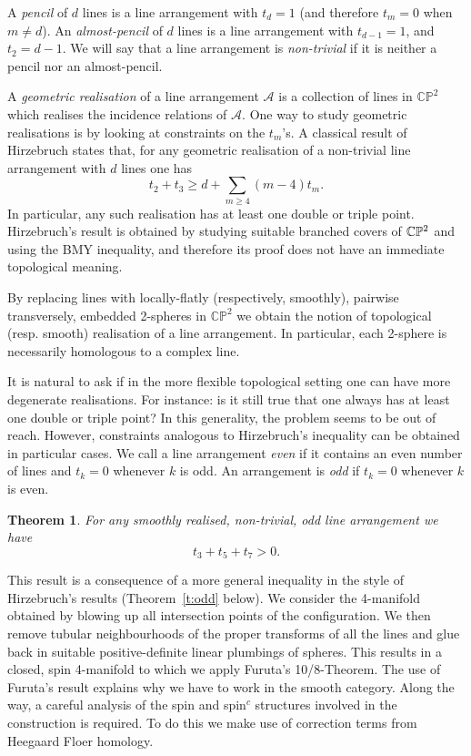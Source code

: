 \documentclass[a4paper,12pt, onesided]{amsart}
\newtheorem{thm}{Theorem}[section]
\theoremstyle{remark}
\numberwithin{figure}{section}
\numberwithin{equation}{section}
\newcommand{\CP}{\mathbb{CP}\vphantom{\mathbb{P}}^2}
\newcommand{\A}{\mathcal{A}}
\begin{document}
A \emph{pencil} of $d$ lines is a line arrangement with $t_d=1$ (and therefore $t_m=0$ when $m\neq d$).
An \emph{almost-pencil} of $d$ lines is a line arrangement with $t_{d-1}=1$, and $t_2 = d-1$.
We will say that a line arrangement is \emph{non-trivial} if it is neither a pencil nor an almost-pencil.

A \emph{geometric realisation} of a line arrangement $\A$ is a collection of lines in $\mathbb{CP}^2$ which realises the incidence relations of $\A$. One way to study geometric realisations is by looking at constraints on the $t_m$'s. A classical result of Hirzebruch \cite{Hirzebruch:1983} states that, for any geometric realisation of a non-trivial line arrangement with $d$ lines one has
\[
t_2+t_3\geq d+\sum_{m\geq 4}(m-4)t_m.
\]
In particular, any such realisation has at least one double or triple point. Hirzebruch's result is obtained by studying suitable branched covers of $\CP$ and using the BMY inequality, and therefore its proof does not have an immediate topological meaning.

By replacing lines with locally-flatly (respectively, smoothly),
pairwise transversely,
embedded 2-spheres in $\mathbb{CP}^2$ we obtain the notion of topological (resp. smooth) realisation of a line arrangement.
In particular, each 2-sphere is necessarily homologous to a complex line.


It is natural to ask if in the more flexible topological setting
one can have more degenerate realisations. For instance: is it still true that one always has at least one double or triple point? In this generality, the problem seems to be out of reach. However, constraints analogous to Hirzebruch's inequality can be obtained in particular cases. We call a line arrangement \emph{even} if it contains an even number of lines and $t_k=0$ whenever $k$ is odd.  An arrangement is \emph{odd} if $t_k=0$ whenever $k$ is even.

\begin{thm}\label{thm:oddbound}
    For any smoothly realised, non-trivial, odd line arrangement  we have
    \[
    t_3+t_5+t_7>0.
    \]
\end{thm}

This result is a consequence of a more general inequality in the style of Hirzebruch's results (Theorem~\ref{t:odd} below). We consider the 4-manifold obtained by blowing up all intersection points of the configuration. We then remove tubular neighbourhoods of the proper transforms of all the lines and glue back in suitable positive-definite linear plumbings of spheres. This results in a closed, spin 4-manifold to which we apply Furuta's 10/8-Theorem. The use of Furuta's result explains why we have to work in the smooth category. Along the way, a careful analysis of the spin and spin$^c$ structures involved in the construction is required. To do this we make use of correction terms from Heegaard Floer homology.
\end{document}
